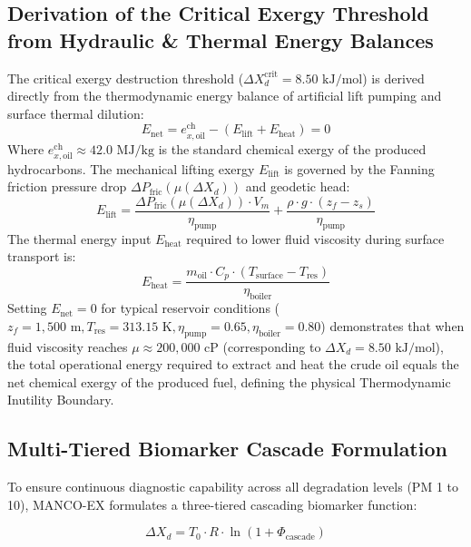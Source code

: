\documentclass[review,12pt]{elsarticle}
\begin{document}
\subsection{Derivation of the Critical Exergy Threshold from Hydraulic \& Thermal Energy Balances}
The critical exergy destruction threshold ($\Delta X_d^{\text{crit}} = 8.50\text{ kJ/mol}$) is derived directly from the thermodynamic energy balance of artificial lift pumping and surface thermal dilution:
\begin{equation}
    E_{\text{net}} = e_{x,\text{oil}}^{\text{ch}} - \left( E_{\text{lift}} + E_{\text{heat}} \right) = 0
\end{equation}
Where $e_{x,\text{oil}}^{\text{ch}} \approx 42.0\text{ MJ/kg}$ is the standard chemical exergy of the produced hydrocarbons. The mechanical lifting exergy $E_{\text{lift}}$ is governed by the Fanning friction pressure drop $\Delta P_{\text{fric}}(\mu(\Delta X_d))$ and geodetic head:
\begin{equation}
    E_{\text{lift}} = \frac{\Delta P_{\text{fric}}(\mu(\Delta X_d)) \cdot V_m}{\eta_{\text{pump}}} + \frac{\rho \cdot g \cdot (z_f - z_s)}{\eta_{\text{pump}}}
\end{equation}
The thermal energy input $E_{\text{heat}}$ required to lower fluid viscosity during surface transport is:
\begin{equation}
    E_{\text{heat}} = \frac{m_{\text{oil}} \cdot C_p \cdot (T_{\text{surface}} - T_{\text{res}})}{\eta_{\text{boiler}}}
\end{equation}
Setting $E_{\text{net}} = 0$ for typical reservoir conditions ($z_f = 1,500\text{ m}, T_{\text{res}} = 313.15\text{ K}, \eta_{\text{pump}} = 0.65, \eta_{\text{boiler}} = 0.80$) demonstrates that when fluid viscosity reaches $\mu \approx 200,000\text{ cP}$ (corresponding to $\Delta X_d = 8.50\text{ kJ/mol}$), the total operational energy required to extract and heat the crude oil equals the net chemical exergy of the produced fuel, defining the physical Thermodynamic Inutility Boundary.

\subsection{Multi-Tiered Biomarker Cascade Formulation}
To ensure continuous diagnostic capability across all degradation levels (PM 1 to 10), MANCO-EX formulates a three-tiered cascading biomarker function:

\begin{equation}
    \Delta X_d = T_0 \cdot R \cdot \ln \left( 1 + \Phi_{\text{cascade}} \right)
\end{equation}
\end{document}
